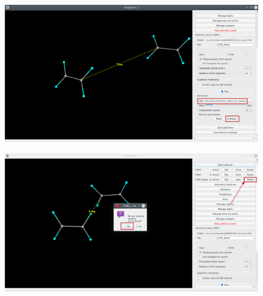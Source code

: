 \documentclass[a4paper,10pt]{article}
\begin{document}
\begin{minipage}{.5\linewidth}
\begin{figure}[H]
\caption{\label{fig:53}}
\begin{center}
\includegraphics[width=0.95\linewidth]{damqt_QS_fig53_b.png}
\end{center}
\end{figure} 
\end{minipage}
\begin{minipage}{.5\linewidth}
\begin{figure}[H]
\caption{\label{fig:54}}
\begin{center}
\includegraphics[width=0.95\linewidth]{damqt_QS_fig54_b.png}
\end{center}
\end{figure} 
\end{minipage}
\end{document}
